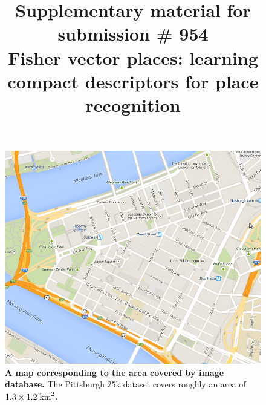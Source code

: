 \documentclass[10pt,onecolumn,A4]{article}
\title{Supplementary material for submission \# 954\\
Fisher vector places: learning compact descriptors for place recognition
 }
\begin{document}
	\maketitle

\begin{figure}
	\center
	\includegraphics[trim = 55mm 40mm 55mm 25mm, clip=true,width=0.5\linewidth]{mapGoogle.png}
	\caption{ \textbf{A map corresponding to the area covered by image database.}
		The Pittsburgh 25k dataset covers roughly an area of $1.3 \times 1.2 \; {\rm km}^2$.
	}
\end{figure}
\end{document}
